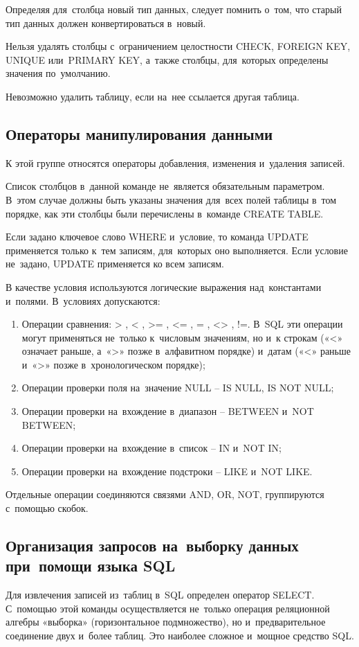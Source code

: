 \documentclass{ou}
\begin{document}
Определяя для~столбца новый тип данных, следует помнить о~том, что старый тип данных должен конвертироваться в~новый. 

Нельзя удалять столбцы с~ограничением целостности CHECK, FOREIGN KEY, UNIQUE или~PRIMARY KEY, а~также столбцы, для~которых определены значения по~умолчанию. 
 
Невозможно удалить таблицу, если на~нее ссылается другая таблица. 
\subsection{Операторы манипулирования данными}
К этой группе относятся операторы добавления, изменения и~удаления записей. 

Список столбцов в~данной команде не~является обязательным параметром. В~этом случае должны быть указаны значения для~всех полей таблицы в~том порядке, как эти столбцы были перечислены в~команде CREATE TABLE. 

Если задано ключевое слово WHERE и~условие, то команда UPDATE применяется только к~тем записям, для~которых оно выполняется. Если условие не~задано, UPDATE применяется ко всем записям. 

В качестве условия используются логические выражения над~константами и~полями. В~условиях допускаются: 
\begin{enumerate}[leftmargin=0em, itemindent=3.75em, nosep, label=\arabic*)]
\item Операции сравнения: > , < , >= , <= , = , <> , !=. В~SQL эти операции могут применяться не~только к~числовым значениям, но и~к строкам («<» означает раньше, а~«>» позже в~алфавитном порядке) и~датам («<» раньше и~«>» позже в~хронологическом порядке);
\item Операции проверки поля на~значение NULL -- IS NULL, IS NOT NULL;
\item Операции проверки на~вхождение в~диапазон -- BETWEEN и~NOT BETWEEN;
\item Операции проверки на~вхождение в~список -- IN и~NOT IN;
\item Операции проверки на~вхождение подстроки -- LIKE и~NOT LIKE.
\end{enumerate}

Отдельные операции соединяются связями AND, OR, NOT, группируются с~помощью скобок. 

\subsection{Организация запросов на~выборку данных при~помощи языка SQL} 
Для извлечения записей из~таблиц в~SQL определен оператор SELECT. С~помощью этой команды осуществляется не~только операция реляционной алгебры «выборка» (горизонтальное подмножество), но и~предварительное соединение двух и~более таблиц. Это наиболее сложное и~мощное средство SQL.
\end{document}
